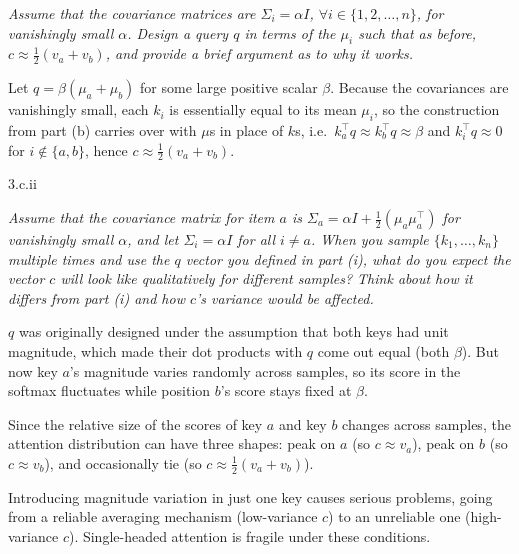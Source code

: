 \textit{Assume that the covariance matrices are $\Sigma_i = \alpha I$, $\forall i \in \{1, 2, \ldots, n\}$, for vanishingly small $\alpha$. Design a query $q$ in terms of the $\mu_i$ such that as before, $c \approx \frac{1}{2}(v_a + v_b)$, and provide a brief argument as to why it works.}

\bigskip


\begin{answer}
    Let $q = \beta(\mu_a + \mu_b)$ for some large positive scalar $\beta$. Because the covariances are vanishingly small, each $k_i$ is essentially equal to its mean $\mu_i$, so the construction from part (b) carries over with $\mu$s in place of $k$s, i.e.\ $k_a^\top q \approx k_b^\top q \approx \beta$ and $k_i^\top q \approx 0$ for $i \notin \{a, b\}$, hence $c \approx \frac{1}{2}(v_a + v_b)$.
\end{answer}


\clearpage

\LARGE
3.c.ii
\normalsize

\textit{Assume that the covariance matrix for item $a$ is $\Sigma_a = \alpha I + \frac{1}{2}(\mu_a \mu_a^\top)$ for vanishingly small $\alpha$, and let $\Sigma_i = \alpha I$ for all $i \neq a$. When you sample $\{k_1, \ldots, k_n\}$ multiple times and use the $q$ vector you defined in part (i), what do you expect the vector $c$ will look like qualitatively for different samples? Think about how it differs from part (i) and how $c$'s variance would be affected.}

\bigskip


\begin{answer}
    $q$ was originally designed under the assumption that both keys had unit magnitude, which made their dot products with $q$ come out equal (both $\beta$). But now key $a$'s magnitude varies randomly across samples, so its score in the softmax fluctuates while position $b$'s score stays fixed at $\beta$.

    Since the relative size of the scores of key $a$ and key $b$ changes across samples, the attention distribution can have three shapes: peak on $a$ (so $c \approx v_a$), peak on $b$ (so $c \approx v_b$), and occasionally tie (so $c \approx \frac{1}{2}(v_a + v_b)$).

    Introducing magnitude variation in just one key causes serious problems, going from a reliable averaging mechanism (low-variance $c$) to an unreliable one (high-variance $c$). Single-headed attention is fragile under these conditions.
\end{answer}

